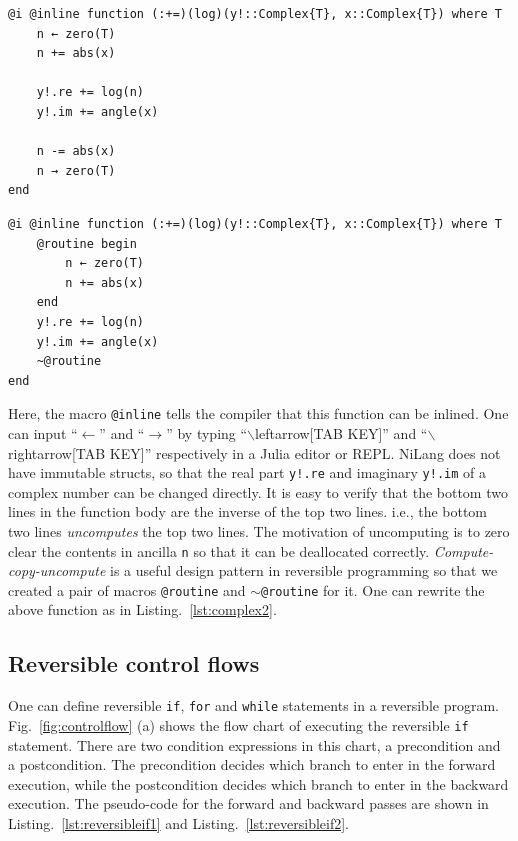\documentclass{article}
\newcommand{\<}{\langle}
\renewcommand{\>}{\rangle}
\newcommand{\Fig}[1]{Fig.~\ref{#1}}
\newcommand{\Lst}[1]{Listing.~\ref{#1}}
\theoremstyle{definition}\newtheorem{definition}{\textit{Definition}}
\begin{document}
\begin{minipage}{.45\columnwidth}
\begin{lstlisting}[mathescape=true,caption={Reversible complex valued log function $y\mathrel{+}=\log(|x|) + i{\rm Arg}(x)$.},label={lst:complex}]
@i @inline function (:+=)(log)(y!::Complex{T}, x::Complex{T}) where T
    n ← zero(T)
    n += abs(x)

    y!.re += log(n)
    y!.im += angle(x)

    n -= abs(x)
    n → zero(T)
end
\end{lstlisting}
\end{minipage}\hfill
\begin{minipage}{.45\columnwidth}
    \begin{lstlisting}[mathescape=true,caption={Compute-copy-uncompute version of \Lst{lst:complex}},label={lst:complex2}]
@i @inline function (:+=)(log)(y!::Complex{T}, x::Complex{T}) where T
    @routine begin
        n ← zero(T)
        n += abs(x)
    end
    y!.re += log(n)
    y!.im += angle(x)
    ~@routine
end
\end{lstlisting}
\end{minipage}

Here, the macro \texttt{@inline} tells the compiler that this function can be inlined. One can input ``$\leftarrow$'' and ``$\rightarrow$'' by typing ``$\backslash$leftarrow[TAB KEY]'' and ``$\backslash$rightarrow[TAB KEY]'' respectively in a Julia editor or REPL.
NiLang does not have immutable structs, so that the real part \texttt{y!.re} and imaginary \texttt{y!.im} of a complex number can be changed directly.
It is easy to verify that the bottom two lines in the function body are the inverse of the top two lines. i.e., the bottom two lines \textit{uncomputes} the top two lines.
The motivation of uncomputing is to zero clear the contents in ancilla \texttt{n} so that it can be deallocated correctly.
\textit{Compute-copy-uncompute} is a useful design pattern in reversible programming so that we created a pair of macros \texttt{@routine} and \texttt{$\sim$@routine} for it. One can rewrite the above function as in \Lst{lst:complex2}.

\subsection{Reversible control flows}
One can define reversible \texttt{if}, \texttt{for} and \texttt{while} statements in a reversible program.
\Fig{fig:controlflow} (a) shows the flow chart of executing the reversible \texttt{if} statement. There are two condition expressions in this chart, a precondition and a postcondition. The precondition decides which branch to enter in the forward execution, while the postcondition decides which branch to enter in the backward execution. The pseudo-code for the forward and backward passes are shown in \Lst{lst:reversibleif1} and \Lst{lst:reversibleif2}.
\end{document}
